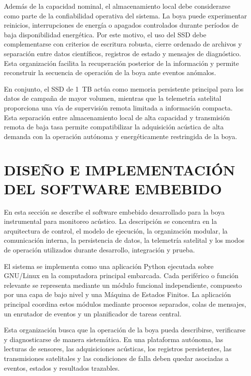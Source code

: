 Además de la capacidad nominal, el almacenamiento local debe considerarse como parte de la confiabilidad operativa del sistema. La boya puede experimentar reinicios, interrupciones de energía o apagados controlados durante períodos de baja disponibilidad energética. Por este motivo, el uso del SSD debe complementarse con criterios de escritura robusta, cierre ordenado de archivos y separación entre datos científicos, registros de estado y mensajes de diagnóstico. Esta organización facilita la recuperación posterior de la información y permite reconstruir la secuencia de operación de la boya ante eventos anómalos.

En conjunto, el SSD de 1~TB actúa como memoria persistente principal para los datos de campaña de mayor volumen, mientras que la telemetría satelital proporciona una vía de supervisión remota limitada a información compacta. Esta separación entre almacenamiento local de alta capacidad y transmisión remota de baja tasa permite compatibilizar la adquisición acústica de alta demanda con la operación autónoma y energéticamente restringida de la boya.

\clearpage
\section{DISEÑO E IMPLEMENTACIÓN DEL SOFTWARE EMBEBIDO}
\label{sec:disenio_implementacion}

En esta sección se describe el software embebido desarrollado para la boya instrumental para monitoreo acústico. La descripción se concentra en la arquitectura de control, el modelo de ejecución, la organización modular, la comunicación interna, la persistencia de datos, la telemetría satelital y los modos de operación utilizados durante desarrollo, integración y prueba.

El sistema se implementa como una aplicación Python ejecutada sobre GNU/Linux en la computadora principal embarcada. Cada periférico o función relevante se representa mediante un módulo funcional independiente, compuesto por una capa de bajo nivel y una Máquina de Estados Finitos. La aplicación principal coordina estos módulos mediante procesos separados, colas de mensajes, un enrutador de eventos y un planificador de tareas central.

Esta organización busca que la operación de la boya pueda describirse, verificarse y diagnosticarse de manera sistemática. En una plataforma autónoma, las lecturas de sensores, las adquisiciones acústicas, los registros persistentes, las transmisiones satelitales y las condiciones de falla deben quedar asociadas a eventos, estados y resultados trazables.

